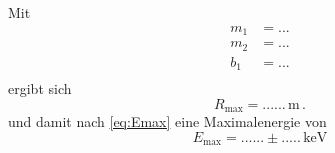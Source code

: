 Mit
\begin{align*}
    m_1 &= ... \\
    m_2 &= ... \\
    b_1 &= ... \\
\end{align*} ergibt sich
\begin{equation*}
    R_\text{max} = ......\, \unit{\meter} \,.
\end{equation*}
und damit nach \eqref{eq:Emax} eine Maximalenergie von
\begin{equation*}
    E_\text{max} = ...... \pm ..... \,\unit{\kilo\eV}
\end{equation*}


